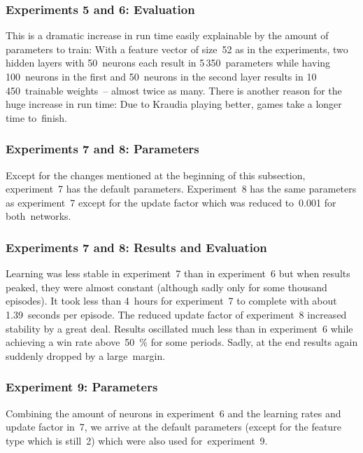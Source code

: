 \documentclass[a4paper,titlepage]{article}
\begin{document}
\subsubsection*{Experiments 5 and 6: Evaluation}

This is a dramatic increase in run time easily explainable by the amount of parameters to train: With a feature vector of size~52 as in the experiments, two hidden layers with 50~neurons each result in 5\,350~parameters while having 100~neurons in the first and 50~neurons in the second layer results in 10\,450~trainable weights~-- almost twice as many. There is another reason for the huge increase in run time: Due to Kraudia playing better, games take a longer time to~finish.

\subsubsection*{Experiments 7 and 8: Parameters}

Except for the changes mentioned at the beginning of this subsection, experiment~7 has the default parameters. Experiment~8 has the same parameters as experiment~7 except for the update factor which was reduced to~0.001 for both~networks.

\subsubsection*{Experiments 7 and 8: Results and Evaluation}

Learning was less stable in experiment~7 than in experiment~6 but when results peaked, they were almost constant (although sadly only for some thousand episodes). It took less than 4~hours for experiment~7 to complete with about 1.39~seconds per episode. The reduced update factor of experiment~8 increased stability by a great deal. Results oscillated much less than in experiment~6 while achieving a win rate above~50~\% for some periods. Sadly, at the end results again suddenly dropped by a large~margin.

\subsubsection*{Experiment 9: Parameters}

Combining the amount of neurons in experiment~6 and the learning rates and update factor in~7, we arrive at the default parameters (except for the feature type which is still~2) which were also used for~experiment~9.
\end{document}
